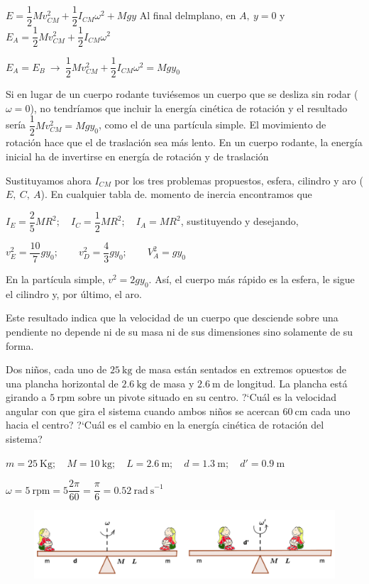 $E=\dfrac 1 2 Mv^2_{CM} + \dfrac 1 2 I_{CM} \omega^2 + Mgy$ 
Al final delmplano, en $A,\ y=0$ y $E_A=\dfrac 1 2 Mv^2_{CM} + \dfrac 1 2 I_{CM} \omega^2$ 

$E_A=E_B \ \to \ \dfrac 1 2 Mv^2_{CM} + \dfrac 1 2 I_{CM} \omega^2=Mgy_0$

Si en lugar de un cuerpo rodante tuviésemos un cuerpo que se desliza sin rodar ($\omega=0$), no tendríamos que incluir la energía cinética de rotación y el resultado sería $\dfrac 1 2 Mv^2_{CM} =Mgy_0$, como el de una partícula simple. El movimiento de rotación hace que el de traslación sea más lento. En un cuerpo rodante, la energía inicial ha de invertirse en energía de rotación y de traslación

Sustituyamos ahora $I_{CM}$ por los tres problemas propuestos, esfera, cilindro y aro ($E,\ C,\ A$). En cualquier tabla de. momento de inercia encontramos que

$I_E=\dfrac 2 5 MR^2;\quad I_C=\dfrac 1 2 MR^2;\quad I_A=MR^2$, sustituyendo y desejando,

$v_E^2=\dfrac {10}{7}gy_0;\qquad v^2_D=\dfrac 4 3 gy_0;\qquad V^2_A=gy_0$ 

En la partícula simple, $v^2=2gy_0$. Así, el cuerpo más rápido es la esfera, le sigue el cilindro y, por último, el aro.

Este resultado indica que la velocidad de un cuerpo que desciende sobre una pendiente no depende ni de su masa ni de sus dimensiones sino solamente de su forma.

\begin{prob}
Dos niños, cada uno de $25\ \mathrm{kg}$ de masa están sentados en extremos opuestos de una plancha horizontal de $2.6\ \mathrm{kg}$ de masa y $2.6\ \mathrm{m}$ de longitud. La plancha está girando a $5\ \mathrm{rpm}$ 	sobre un pivote situado en su centro. ?`Cuál es la velocidad angular con que gira el sistema cuando ambos niños se acercan $60\ \mathrm{cm}$ cada uno hacia el centro? ?`Cuál es el cambio en la energía cinética de rotación del sistema?
\end{prob}

$m=25\ \mathrm{Kg};\quad M=10\ \mathrm{kg};\quad L=2.6\ \mathrm{m};\quad d=1.3\ \mathrm{m}; \quad d'=0.9\ \mathrm{m}$

$\omega= 5 \ \mathrm{rpm}=5\dfrac {2\pi}{60} = \dfrac \pi 6 =0.52 \ \mathrm{rad\ s}^{-1}$

\begin{figure}[H]
	\centering
	\includegraphics[width=.8\textwidth]{imagenes/imagenes16/T16IM19.png}
\end{figure}	

